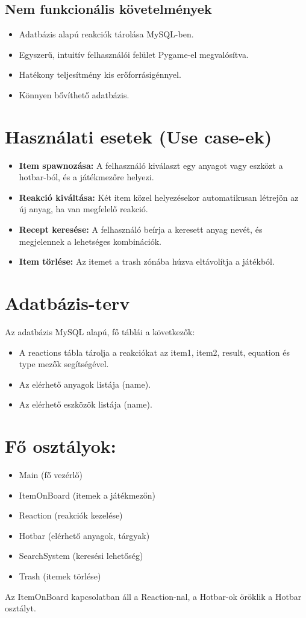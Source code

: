 \documentclass[]{thesis-ekf}
\begin{document}
	\subsection{Nem funkcionális követelmények}
	\begin{itemize}
		\item Adatbázis alapú reakciók tárolása MySQL-ben.
		\item Egyszerű, intuitív felhasználói felület Pygame-el megvalósítva.
		\item Hatékony teljesítmény kis erőforrásigénnyel.
		\item Könnyen bővíthető adatbázis.
	\end{itemize}
	
	
	\section{Használati esetek (Use case-ek)}
	\begin{itemize}
		\item \textbf{Item spawnozása:} A felhasználó kiválaszt egy anyagot vagy eszközt a hotbar-ból, és a játékmezőre helyezi.
		\item \textbf{Reakció kiváltása:} Két item közel helyezésekor automatikusan létrejön az új anyag, ha van megfelelő reakció.
		\item \textbf{Recept keresése:} A felhasználó beírja a keresett anyag nevét, és megjelennek a lehetséges kombinációk.
		\item \textbf{Item törlése:} Az itemet a trash zónába húzva eltávolítja a játékból.
	\end{itemize}
	\section{Adatbázis-terv}
	
	Az adatbázis MySQL alapú, fő táblái a következők:
	\begin{itemize}
		\item  A reactions tábla tárolja a reakciókat az item1, item2, result, equation és type mezők segítségével.
		\item  Az elérhető anyagok listája (name).
		\item  Az elérhető eszközök listája (name).
	\end{itemize}
	
	\section{Fő osztályok:}
	\begin{itemize}
		\item Main (fő vezérlő)
		\item ItemOnBoard (itemek a játékmezőn)
		\item Reaction (reakciók kezelése)
		\item Hotbar (elérhető anyagok, tárgyak)
		\item SearchSystem (keresési lehetőség)
		\item Trash (itemek törlése)
	\end{itemize}
	Az ItemOnBoard kapcsolatban áll a Reaction-nal, a Hotbar-ok öröklik a Hotbar osztályt.
\end{document}
